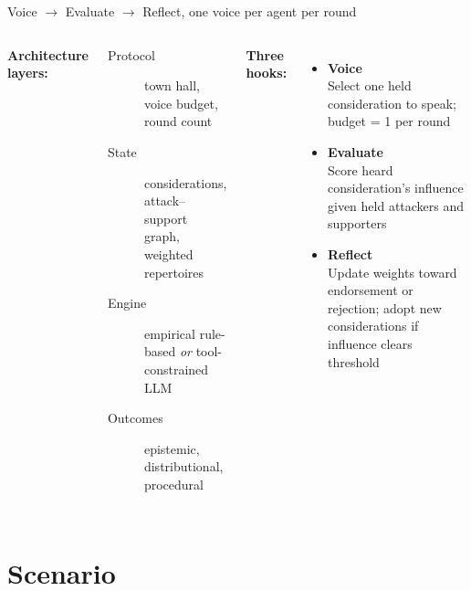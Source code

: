 \documentclass[aspectratio=169,11pt]{beamer}
\begin{document}
\begin{frame}{Voice $\to$ Evaluate $\to$ Reflect, one voice per agent per round}

\begin{columns}[T]
\textbf{Architecture layers:}
\begin{description}
    \item[Protocol] town hall, voice budget, round count
    \item[State] considerations, attack--support graph, weighted repertoires
    \item[Engine] empirical rule-based \textit{or} tool-constrained LLM
    \item[Outcomes] epistemic, distributional, procedural
\end{description}

\textbf{Three hooks:}
\begin{itemize}
    \item \textbf{Voice} \\
    {\small Select one held consideration to speak; budget = 1 per round}
    \item \textbf{Evaluate} \\
    {\small Score heard consideration's influence given held attackers and supporters}
    \item \textbf{Reflect} \\
    {\small Update weights toward endorsement or rejection; adopt new considerations if influence clears threshold}
\end{itemize}
\end{columns}

\end{frame}

\section{Scenario}
\end{document}
